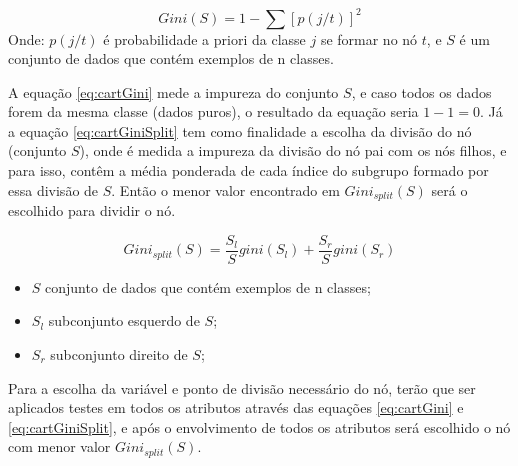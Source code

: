 \begin{equation}
Gini(S)= 1 - \sum [p(j/t)]^2
 \label{eq:cartGini}
\end{equation}
Onde: ${p(j/t)}$ é probabilidade a priori da classe ${j}$ se formar no nó ${t}$, e ${S}$ é um conjunto de dados que contém exemplos de n classes.

A equação \ref{eq:cartGini} mede a impureza do conjunto ${S}$, e caso todos os dados forem da mesma classe (dados puros), o resultado da equação seria ${1-1=0}$. Já a equação \ref{eq:cartGiniSplit} tem como  finalidade a escolha da divisão do nó (conjunto ${S}$), onde é medida a impureza da divisão do nó pai com os nós filhos, e para isso, contêm a média ponderada de cada índice do subgrupo formado por essa divisão de ${S}$. Então o menor valor encontrado em ${Gini_{split}(S)}$ será o escolhido para dividir o nó. 

\begin{equation}
Gini_{split}(S) = \frac{S_l}{S}gini(S_l)+\frac{S_r}{S}gini(S_r)
 \label{eq:cartGiniSplit}
\end{equation}

\begin{itemize}[noitemsep]
            \item ${S}$ conjunto de dados que contém exemplos de n classes;
            \item ${S_l}$ subconjunto esquerdo de ${S}$;
            \item ${S_r}$ subconjunto direito de ${S}$;
        \end{itemize}

Para a escolha da variável e ponto de divisão necessário do nó, terão que ser aplicados testes em todos os atributos através das equações \ref{eq:cartGini} e \ref{eq:cartGiniSplit}, e após o envolvimento de todos os atributos será escolhido o nó com menor valor ${Gini_{split}(S)}$.



